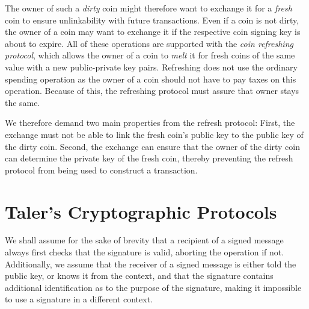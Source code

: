 \documentclass{llncs}
\begin{document}
The owner of such a {\em dirty} coin might therefore want to exchange it
for a {\em fresh} coin to ensure unlinkability with future transactions.
Even if a coin is not dirty, the owner of a coin may want to exchange it
if the respective coin signing key is about to expire.  All of these
operations are supported with the {\em coin refreshing protocol}, which
allows the owner of a coin to {\em melt} it for fresh coins of the same
value with a new public-private key pairs.  Refreshing does not use the
ordinary spending operation as the owner of a coin should not have to
pay taxes on this operation.  Because of this, the refreshing protocol
must assure that owner stays the same.

We therefore demand two main properties from the refresh protocol:
First, the exchange must not be able to link the fresh coin's public key to
the public key of the dirty coin.  Second, the exchange can ensure that the
owner of the dirty coin can determine the private key of the
fresh coin, thereby preventing the refresh protocol from being used to
construct a transaction.

%


\section{Taler's Cryptographic Protocols}


We shall assume for the sake of brevity that a recipient of a signed
message always first checks that the signature is valid, aborting the
operation if not.  Additionally, we assume that the receiver of a
signed message is either told the public key, or knows it from the
context, and that the signature contains additional identification as
to the purpose of the signature, making it impossible to use a signature
in a different context.
\end{document}
